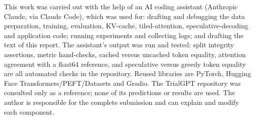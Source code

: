 This work was carried out with the help of an AI coding assistant (Anthropic Claude, via Claude Code), which was used for: drafting and debugging the data preparation, training, evaluation, KV-cache, tiled-attention, speculative-decoding and application code; running experiments and collecting logs; and drafting the text of this report. The assistant's output was run and tested: split integrity assertions, metric hand-checks, cached versus uncached token equality, attention agreement with a float64 reference, and speculative versus greedy token equality are all automated checks in the repository. Reused libraries are PyTorch, Hugging Face Transformers/PEFT/Datasets and Gradio. The TrialGPT repository was consulted only as a reference; none of its predictions or results are used. The author is responsible for the complete submission and can explain and modify each component.
